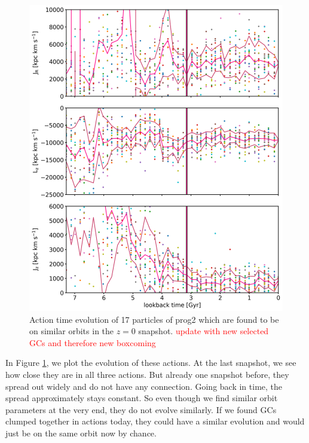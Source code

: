 \begin{figure}[htbp]
\captionsetup{format=plain}
    \centering
	\includegraphics[width=\textwidth]{plots/Dynamics/prog2/action_time_evolution_box_hist_mean_prog2.png}

	\caption{Action time evolution of 17 particles of prog2 which are found to be on similar orbits in the $z=0$ snapshot. \textcolor{red}{update with new selected GCs and therefore new boxcoming} }\label{fig:actions_box_time_evolution_prog2}
\end{figure}
In Figure \ref{fig:actions_box_time_evolution_prog2}, we plot the evolution of these actions. At the last snapshot, we see how close they are in all three actions. But already one snapshot before, they spread out widely and do not have any connection. Going back in time, the spread approximately stays constant. So even though we find similar orbit parameters at the very end, they do not evolve similarly. If we found \acp{GC} clumped together in actions today, they could have a similar evolution and would just be on the same orbit now by chance.

